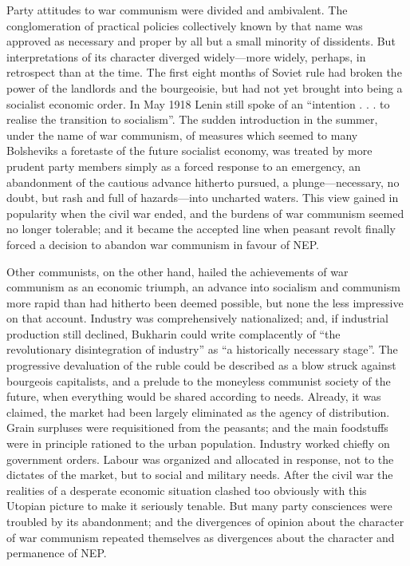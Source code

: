 Party attitudes to war communism were divided and ambivalent. The conglomeration of practical policies collectively known by that name was approved as necessary and proper by all but a small minority of dissidents. But interpretations of its character diverged widely---more widely, perhaps, in retrospect than at the time. The first eight months of Soviet rule had broken the power of the landlords and the bourgeoisie, but had not yet brought into being a socialist economic order. In May 1918 Lenin still spoke of an ``intention . . . to realise the transition to socialism''. The sudden introduction in the summer, under the name of war communism, of measures which seemed to many Bolsheviks a foretaste of the future socialist economy, was treated by more prudent party members simply as a forced response to an emergency, an abandonment of the cautious advance hitherto pursued, a plunge---necessary, no doubt, but rash and full of hazards---into uncharted waters. This view gained in popularity when the civil war ended, and the burdens of war communism seemed no longer tolerable; and it became the accepted line when peasant revolt finally forced a decision to abandon war communism in favour of NEP. 

Other communists, on the other hand, hailed the achievements of war communism as an economic triumph, an advance into socialism and communism more rapid than had hitherto been deemed possible, but none the less impressive on that account. Industry was comprehensively nationalized; and, if industrial production still declined, Bukharin could write complacently of ``the revolutionary disintegration of industry'' as ``a historically necessary stage''. The progressive devaluation of the ruble could be described as a blow struck against bourgeois capitalists, and a prelude to the moneyless communist society of the future, when everything would be shared according to needs. Already, it was claimed, the market had been largely eliminated as the agency of distribution. Grain surpluses were requisitioned from the peasants; and the main foodstuffs were in principle rationed to the urban population. Industry worked chiefly on government orders. Labour was organized and allocated in response, not to the dictates of the market, but to social and military needs. After the civil war the realities of a desperate economic situation clashed too obviously with this Utopian picture to make it seriously tenable. But many party consciences were troubled by its abandonment; and the divergences of opinion about the character of war communism repeated themselves as divergences about the character and permanence of NEP.
